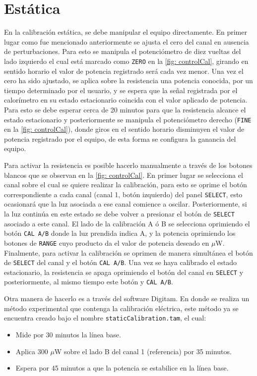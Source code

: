 	\section{Est\'atica}
	En la calibración estática, se debe manipular el equipo directamente. En primer lugar como fue mencionado anteriormente se ajusta el cero del canal en ausencia de perturbaciones. Para esto se manipula el potenciómetro de diez vueltas del lado izquierdo el cual está marcado como \texttt{ZERO} en la \autoref{fig: controlCal}, girando en sentido horario el valor de potencia registrado será cada vez menor. Una vez el cero ha sido ajustado, se aplica sobre la resistencia una potencia conocida, por un tiempo determinado por el usuario, y se espera que la señal registrada por el calorímetro en su estado estacionario coincida con el valor aplicado de potencia. Para esto se debe esperar cerca de 20 minutos para que la resistencia alcance el estado estacionario y posteriormente se manipula el potenciómetro derecho (\texttt{FINE} en la \autoref{fig: controlCal}), donde giros en el sentido horario disminuyen el valor de potencia registrado por el equipo, de esta forma se configura la ganancia del equipo.

	Para activar la resistencia es posible hacerlo manualmente a través de los botones blancos que se observan en la \autoref{fig: controlCal}. En primer lugar se selecciona el canal sobre el cual se quiere realizar la calibración, para esto se oprime el botón correspondiente a cada canal (canal 1, botón izquierdo) del panel \texttt{SELECT}, esto ocasionará que la luz asociada a ese canal comience a oscilar. Posteriormente, si la luz continúa en este estado se debe volver a presionar el botón de \texttt{SELECT} asociado a este canal. El lado de la calibración A ó B se selecciona oprimiendo el botón \texttt{CAL A/B} donde la luz prendida indica A, y la potencia oprimiendo los botones de \texttt{RANGE} cuyo producto da el valor de potencia deseado en $\mu$W. Finalmente, para activar la calibración se oprimen de manera simultánea el botón de \texttt{SELECT} del canal y el botón \texttt{CAL A/B}. Una vez se haya calibrado el estado estacionario, la resistencia se apaga oprimiendo el botón del canal en \texttt{SELECT} y posteriormente, al mismo tiempo este botón y \texttt{CAL A/B}.
	
	Otra manera de hacerlo es a través del software Digitam. En donde se realiza un método experimental que contenga la calibración eléctrica, este método ya se encuentra creado bajo el nombre \texttt{staticCalibration.tam}, el cual:
	\begin{itemize}
		\item Mide por 30 minutos la línea base.
		\item Aplica 300 $\mu$W sobre el lado B del canal 1 (referencia) por 35 minutos.
		\item Espera por 45 minutos a que la potencia se estabilice en la línea base.
	\end{itemize}

